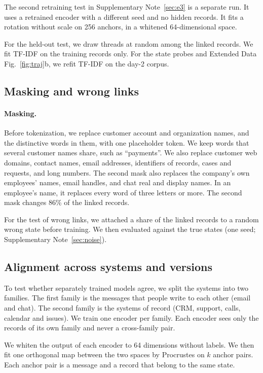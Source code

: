 \documentclass[11pt]{article}
\begin{document}
The second retraining test in Supplementary Note~\ref{sec:e3} is a separate run. It uses a retrained encoder with a different seed and no hidden records. It fits a rotation without scale on 256 anchors, in a whitened 64-dimensional space.

For the held-out test, we draw threads at random among the linked records. We fit TF-IDF on the training records only. For the state probes and Extended Data Fig.~\ref{fig:traj}b, we refit TF-IDF on the day-2 corpus.

\subsection{Masking and wrong links}
\paragraph{Masking.} Before tokenization, we replace customer account and organization names, and the distinctive words in them, with one placeholder token. We keep words that several customer names share, such as ``payments''. We also replace customer web domains, contact names, email addresses, identifiers of records, cases and requests, and long numbers. The second mask also replaces the company's own employees' names, email handles, and chat real and display names. In an employee's name, it replaces every word of three letters or more. The second mask changes 86\% of the linked records.

For the test of wrong links, we attached a share of the linked records to a random wrong state before training. We then evaluated against the true states (one seed; Supplementary Note~\ref{sec:noise}).

\subsection{Alignment across systems and versions}
To test whether separately trained models agree, we split the systems into two families. The first family is the messages that people write to each other (email and chat). The second family is the systems of record (CRM, support, calls, calendar and issues). We train one encoder per family. Each encoder sees only the records of its own family and never a cross-family pair.

We whiten the output of each encoder to 64 dimensions without labels. We then fit one orthogonal map between the two spaces by Procrustes on $k$ anchor pairs. Each anchor pair is a message and a record that belong to the same state.
\end{document}
